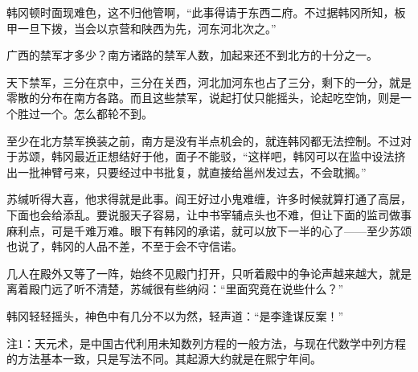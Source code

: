 韩冈顿时面现难色，这不归他管啊，“此事得请于东西二府。不过据韩冈所知，板甲一旦下拨，当会以京营和陕西为先，河东河北次之。”

广西的禁军才多少？南方诸路的禁军人数，加起来还不到北方的十分之一。

天下禁军，三分在京中，三分在关西，河北加河东也占了三分，剩下的一分，就是零散的分布在南方各路。而且这些禁军，说起打仗只能摇头，论起吃空饷，则是一个胜过一个。怎么都轮不到。

至少在北方禁军换装之前，南方是没有半点机会的，就连韩冈都无法控制。不过对于苏颂，韩冈最近正想结好于他，面子不能驳，“这样吧，韩冈可以在监中设法挤出一批神臂弓来，只要经过中书批复，就直接给邕州发过去，不会耽搁。”

苏缄听得大喜，他求得就是此事。阎王好过小鬼难缠，许多时候就算打通了高层，下面也会给添乱。要说服天子容易，让中书宰辅点头也不难，但让下面的监司做事麻利点，可是千难万难。眼下有韩冈的承诺，就可以放下一半的心了——至少苏颂也说了，韩冈的人品不差，不至于会不守信诺。

几人在殿外又等了一阵，始终不见殿门打开，只听着殿中的争论声越来越大，就是离着殿门远了听不清楚，苏缄很有些纳闷：“里面究竟在说些什么？”

韩冈轻轻摇头，神色中有几分不以为然，轻声道：“是李逢谋反案！”

注1：天元术，是中国古代利用未知数列方程的一般方法，与现在代数学中列方程的方法基本一致，只是写法不同。其起源大约就是在熙宁年间。

